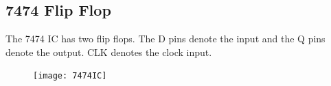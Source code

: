 

\subsection{7474 Flip Flop}
The 7474 IC has two flip flops.  The D pins denote the input and the Q pins denote the output. CLK denotes the clock input.
%
%
\begin{figure}
\begin{center}
\texttt{[image: 7474IC]}
\end{center}
\caption{}
\label{fig:7474IC}
\end{figure}


